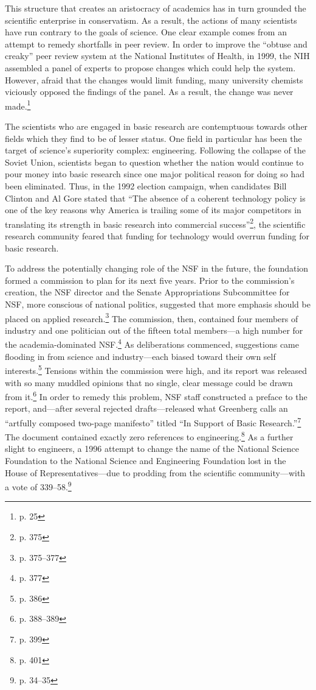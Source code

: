 \documentclass{article}[12pt]
\begin{document}
This structure that creates an aristocracy of academics has in turn grounded
the scientific enterprise in conservatism. As a result, the actions of many
scientists have run contrary to the goals of science. One clear example comes
from an attempt to remedy shortfalls in peer review. In order to improve the
``obtuse and creaky'' peer review system at the National Institutes of Health,
in 1999, the NIH assembled a panel of experts to propose changes which could
help the system. However, afraid that the changes would limit funding, many
university chemists viciously opposed the findings of the panel. As a result,
the change was never made.\footnote{p. 25}

The scientists who are engaged in basic research are contemptuous towards other
fields which they find to be of lesser status. One field in particular has been
the target of science's superiority complex: engineering. Following the
collapse of the Soviet Union, scientists began to question whether the nation
would continue to pour money into basic research since one major political
reason for doing so had been eliminated. Thus, in the 1992 election campaign,
when candidates Bill Clinton and Al Gore stated that ``The absence of a
coherent technology policy is one of the key reasons why America is trailing
some of its major competitors in translating its strength in basic research
into commercial success''\footnote{p. 375}, the scientific research community
feared that funding for technology would overrun funding for basic research. 

To address the potentially changing role of the NSF in the future,
the foundation formed a commission to plan for its next five years. Prior to
the commission's creation, the NSF director and the Senate Appropriations
Subcommittee for NSF, more conscious of national politics, suggested that more
emphasis should be placed on applied research.\footnote{p. 375--377} The
commission, then, contained four members of industry and one politician out of
the fifteen total members---a high number for the academia-dominated
NSF.\footnote{p. 377} As deliberations commenced, suggestions came flooding in
from science and industry---each biased toward their own self
interests.\footnote{p. 386} Tensions within the commission were high, and its
report was released with so many muddled opinions that no single, clear message
could be drawn from it.\footnote{p. 388--389} In order to remedy this problem,
NSF staff constructed a preface to the report, and---after several rejected
drafts---released what Greenberg calls an ``artfully composed two-page
manifesto'' titled ``In Support of Basic Research.''\footnote{p. 399} The
document contained exactly zero references to engineering.\footnote{p. 401} As a
further slight to engineers, a 1996 attempt to change the name of the National
Science Foundation to the National Science and Engineering Foundation lost in
the House of Representatives---due to prodding from the scientific
community---with a vote of 339--58.\footnote{p. 34--35}
\end{document}
